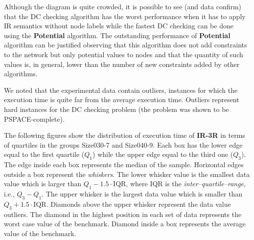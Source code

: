 \documentclass[a4paper,11pt]{article}
\begin{document}
\begin{center}
\end{center}

Although the diagram is quite crowded, it is possible to see (and data confirm) that the DC checking algorithm has the worst performance when it has to
apply IR semantics without node labels while the fastest DC checking can be done using the \textbf{Potential} algorithm.
The outstanding performance of \textbf{Potential} algorithm can be justified observing that this algorithm does not add constraints to the network but only potential values to nodes and that the quantity of such values is, in general, lower than the number of new constraints added by other algorithms.

We noted that the experimental data contain outliers, instances for which the execution time is quite far from the average execution time.
Outliers represent hard instances for the DC checking problem (the problem was shown to be PSPACE-complete).

The following figures show the distribution of execution time of \textbf{IR-3R} in terms of quartiles in the groups Size030-7 and Size040-9.
Each box has the lower edge equal to the first quartile ($Q_1$) while the upper edge equal to the third one ($Q_3$).
The edge inside each box represents the median of the sample.
Horizontal edges outside a box represent the \textit{whiskers}. The lower whisker value is the smallest data value which is larger than $Q_1-1.5\cdot \mathrm{IQR}$, where IQR is the \textit{inter–quartile–range}, i.e.,  $Q_3-Q_1$. The upper whisker is the largest data value which is smaller than $Q_3+1.5\cdot \mathrm{IQR}$.
Diamonds above the upper whisker represent the data value outliers. 	The diamond in the highest position in each set of data represents the worst case value of the benchmark. Diamond inside a box represents the average value of the benchmark.
\smallskip
\end{document}
